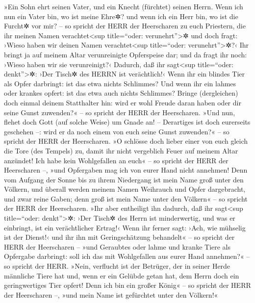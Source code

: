  »Ein Sohn ehrt seinen Vater, und ein Knecht (fürchtet)
seinen Herrn. Wenn ich nun ein Vater bin, wo ist meine Ehre✲? und wenn
ich ein Herr bin, wo ist die Furcht✲ vor mir? -- so spricht der HERR der
Heerscharen zu euch Priestern, die ihr meinen Namen
verachtet\textless sup title=``oder: verunehrt''\textgreater✲ und doch
fragt: ›Wieso haben wir deinen Namen verachtet\textless sup
title=``oder: verunehrt''\textgreater✲?‹  Ihr bringt ja
auf meinem Altar verunreinigte Opferspeise dar; und da fragt ihr noch:
›Wieso haben wir sie verunreinigt?‹ Dadurch, daß ihr sagt\textless sup
title=``oder: denkt''\textgreater✲: ›Der Tisch✲ des HERRN ist
verächtlich!‹  Wenn ihr ein blindes Tier als Opfer
darbringt: ist das etwa nichts Schlimmes? Und wenn ihr ein lahmes oder
krankes opfert: ist das etwa auch nichts Schlimmes? Bringe (dergleichen)
doch einmal deinem Statthalter hin: wird er wohl Freude daran haben oder
dir seine Gunst zuwenden?« -- so spricht der HERR der Heerscharen.
 »Und nun, flehet doch Gott (auf solche Weise) um Gnade
an! -- Derartiges ist doch eurerseits geschehen --: wird er da noch
einem von euch seine Gunst zuwenden?« -- so spricht der HERR der
Heerscharen.  »O schlösse doch lieber einer von euch
gleich die Tore (des Tempels) zu, damit ihr nicht vergeblich Feuer auf
meinem Altar anzündet! Ich habe kein Wohlgefallen an euch« -- so spricht
der HERR der Heerscharen --, »und Opfergaben mag ich von eurer Hand
nicht annehmen!  Denn vom Aufgang der Sonne bis zu ihrem
Niedergang ist mein Name groß unter den Völkern, und überall werden
meinem Namen Weihrauch und Opfer dargebracht, und zwar reine Gaben; denn
groß ist mein Name unter den Völkern« -- so spricht der HERR der
Heerscharen.  »Ihr aber entheiligt ihn dadurch, daß ihr
sagt\textless sup title=``oder: denkt''\textgreater✲: ›Der Tisch✲ des
Herrn ist minderwertig, und was er einbringt, ist ein verächtlicher
Ertrag!‹  Wenn ihr ferner sagt: ›Ach, wie mühselig ist
der Dienst!‹ und ihr ihn mit Geringschätzung behandelt« -- so spricht
der HERR der Heerscharen -- »und Geraubtes oder lahme und kranke Tiere
als Opfergabe darbringt: soll ich das mit Wohlgefallen aus eurer Hand
annehmen?« -- so spricht der HERR.  »Nein, verflucht ist
der Betrüger, der in seiner Herde männliche Tiere hat und, wenn er ein
Gelübde getan hat, dem Herrn doch ein geringwertiges Tier opfert! Denn
ich bin ein großer König« -- so spricht der HERR der Heerscharen --,
»und mein Name ist gefürchtet unter den Völkern!«

